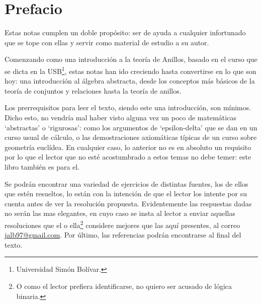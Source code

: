 \chapter{Prefacio}%
\label{cha:Prefacio}


{\noindent Estas notas cumplen un doble propósito: ser de ayuda a cualquier infortunado que se tope con ellas y servir como material de estudio a su autor. }

Comenzando como una introducción a la teoría de Anillos, basado en el curso que se dicta en la USB\footnote{Universidad Simón Bolívar.}, estas notas han ido creciendo hasta convertirse en lo que son hoy: una introducción al álgebra abstracta, desde los conceptos más básicos de la teoría de conjuntos y relaciones hasta la teoría de anillos. 

Los prerrequisitos para leer el texto, siendo este una introducción, son mínimos. Dicho esto, no vendría mal haber visto alguna vez un poco de matemáticas `abstractas' o `rigurosas': como los argumentos de `epsilon-delta' que se dan en un curso usual de cálculo, o las demostraciones axiomáticas típicas de un curso sobre geometría euclídea. En cualquier caso, lo anterior no es en absoluto un requisito por lo que el lector que no esté acostumbrado a estos temas no debe temer: este libro también es para el.


Se podrán encontrar una variedad de ejercicios de distintas fuentes, los de ellos que estén resueltos, lo están con la intención de que el lector los intente por su cuenta antes de ver la resolución propuesta. Evidentemente las respuestas dadas no serán las mas elegantes, en cuyo caso se insta al lector a enviar aquellas resoluciones que el o ella\footnote{O como el lector prefiera identificarse, no quiero ser acusado de lógica binaria.} considere mejores que las aquí presentes, al correo \url{jalb97@gmail.com}. 
%
Por último, las referencias podrán encontrarse al final del texto. 
